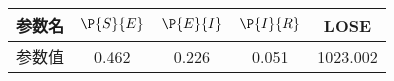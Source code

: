 \begin{tabular}{ccccc}
\hline
参数名&$\P{S}{E}$&$\P{E}{I}$&$\P{I}{R}$&LOSE\\
\hline
参数值&0.462&0.226&0.051&1023.002\\
\hline
\end{tabular}
